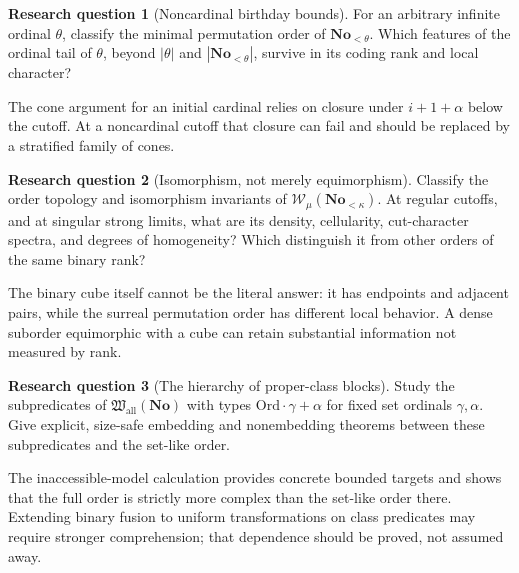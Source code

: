 \documentclass[11pt]{article}
\theoremstyle{definition}
\newtheorem{question}[question]{Research question}
\theoremstyle{remark}
\newcommand{\No}{\mathbf{No}}
\newcommand{\Ord}{\mathrm{Ord}}
\newcommand{\WO}{\mathcal W}
\newcommand{\Hall}{\mathfrak W_{\mathrm{all}}}
\begin{document}
\begin{question}[Noncardinal birthday bounds]\label{swo:st:n14.2}
For an arbitrary infinite ordinal $\theta$, classify the minimal
permutation order of $\No_{<\theta}$. Which features of the ordinal tail of
$\theta$, beyond $|\theta|$ and $|\No_{<\theta}|$, survive in its coding
rank and local character?
\end{question}
The cone argument for an initial cardinal relies on closure under
$i+1+\alpha$ below the cutoff. At a noncardinal cutoff that closure can
fail and should be replaced by a stratified family of cones.

\begin{question}[Isomorphism, not merely equimorphism]\label{swo:st:n14.3}
Classify the order topology and isomorphism invariants of
$\WO_\mu(\No_{<\kappa})$. At regular cutoffs, and at singular strong limits,
what are its density, cellularity, cut-character spectra, and degrees of
homogeneity? Which distinguish it from other orders of the same binary
rank?
\end{question}
The binary cube itself cannot be the literal answer: it has endpoints
and adjacent pairs, while the surreal permutation order has different
local behavior. A dense suborder equimorphic with a cube can retain
substantial information not measured by rank.

\begin{question}[The hierarchy of proper-class blocks]\label{swo:st:n14.4}
Study the subpredicates of $\Hall(\No)$ with types
$\Ord\cdot\gamma+\alpha$ for fixed set ordinals $\gamma,\alpha$.
Give explicit, size-safe embedding and nonembedding theorems between
these subpredicates and the set-like order.
\end{question}
The inaccessible-model calculation provides concrete bounded targets and
shows that the full order is strictly more complex than the set-like
order there. Extending binary fusion to uniform transformations on
class predicates may require stronger comprehension; that dependence
should be proved, not assumed away.
\end{document}

